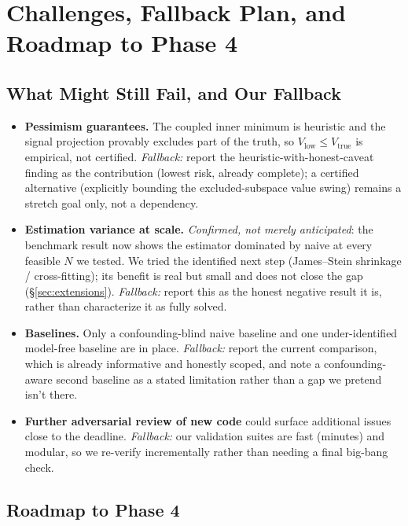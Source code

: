 \documentclass[11pt]{article}
\begin{document}
\section{Challenges, Fallback Plan, and Roadmap to Phase 4}
\label{sec:fallback}

\subsection{What Might Still Fail, and Our Fallback}

\begin{itemize}
  \item \textbf{Pessimism guarantees.} The coupled inner minimum is heuristic and the
  signal projection provably excludes part of the truth, so $V_{\mathrm{low}} \le
  V_{\mathrm{true}}$ is empirical, not certified. \emph{Fallback:} report the
  heuristic-with-honest-caveat finding as the contribution (lowest risk, already
  complete); a certified alternative (explicitly bounding the excluded-subspace value
  swing) remains a stretch goal only, not a dependency.
  \item \textbf{Estimation variance at scale.} \emph{Confirmed, not merely anticipated}:
  the benchmark result now shows the estimator dominated by naive at every feasible $N$ we
  tested. We tried the identified next step (James--Stein shrinkage / cross-fitting); its
  benefit is real but small and does not close the gap (\S\ref{sec:extensions}).
  \emph{Fallback:} report this as the honest negative result it is, rather than
  characterize it as fully solved.
  \item \textbf{Baselines.} Only a confounding-blind naive baseline and one
  under-identified model-free baseline are in place. \emph{Fallback:} report the current
  comparison, which is already informative and honestly scoped, and note a
  confounding-aware second baseline as a stated limitation rather than a gap we pretend
  isn't there.
  \item \textbf{Further adversarial review of new code} could surface additional issues
  close to the deadline. \emph{Fallback:} our validation suites are fast (minutes) and
  modular, so we re-verify incrementally rather than needing a final big-bang check.
\end{itemize}

\subsection{Roadmap to Phase 4}
\end{document}
